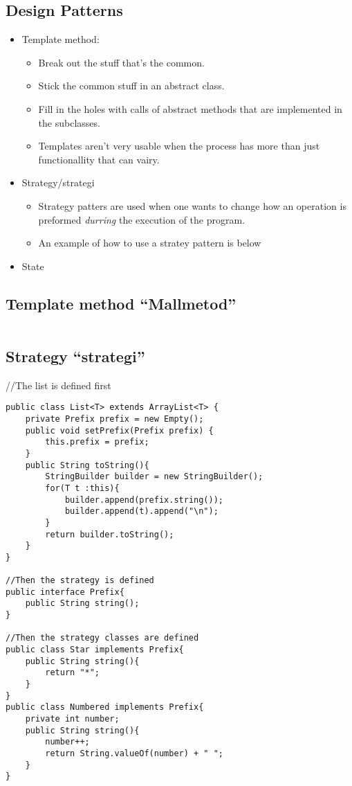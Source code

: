 \documentclass[11pt]{amsart}
\begin{document}
\subsection{Design Patterns}
\begin{itemize}
\item Template method:
	\begin{itemize}
	  \item Break out the stuff that's the common.
	  \item Stick the common stuff in an abstract class.
	  \item Fill in the holes with calls of abstract methods that are implemented
	  in the subclasses.
	  \item Templates aren't very usable when the process has more than just
	  functionallity that can vairy.
	\end{itemize}
\item Strategy/strategi
	\begin{itemize}
	  \item Strategy patters are used when one wants to change how an operation is
	  preformed \textit{durring} the execution of the program.
	  \item An example of how to use a stratey pattern is below
	\end{itemize}
\item State
	\begin{itemize}
	\end{itemize}
\end{itemize}

\subsection{Template method ``Mallmetod''}
\begin{lstlisting}

\end{lstlisting}

\subsection{Strategy ``strategi''}
//The list is defined first
\begin{lstlisting}
public class List<T> extends ArrayList<T> { 
	private Prefix prefix = new Empty();
	public void setPrefix(Prefix prefix) {
		this.prefix = prefix;
	}
	public String toString(){
		StringBuilder builder = new StringBuilder();
		for(T t :this){
			builder.append(prefix.string());
			builder.append(t).append("\n");
		}
		return builder.toString();
	}
}

//Then the strategy is defined
public interface Prefix{
	public String string();
}

//Then the strategy classes are defined
public class Star implements Prefix{
	public String string(){
		return "*";
	}
}
public class Numbered implements Prefix{
	private int number;
	public String string(){
		number++;
		return String.valueOf(number) + " ";
	}
}
\end{lstlisting}
\end{document}
